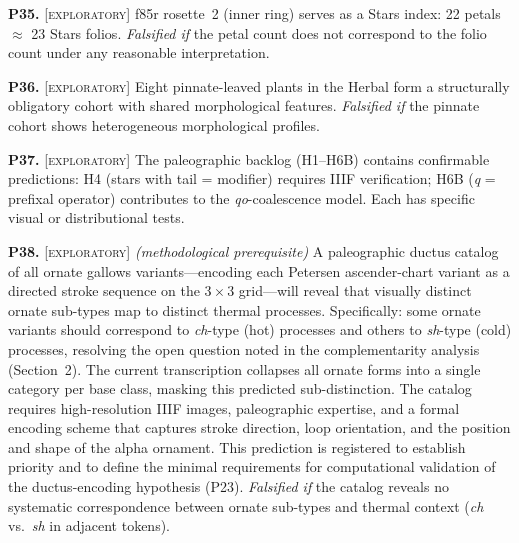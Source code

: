 \documentclass[11pt,a4paper]{article}
\newcommand{\exploratory}{\textsc{[exploratory]}}
\newcommand{\falsmark}{\textit{Falsified if}}
\begin{document}
\medskip

\noindent\textbf{P35.} \exploratory{} f85r rosette~2 (inner ring) serves as a Stars index: 22 petals $\approx$ 23 Stars folios. \falsmark{} the petal count does not correspond to the folio count under any reasonable interpretation.

\medskip

\noindent\textbf{P36.} \exploratory{} Eight pinnate-leaved plants in the Herbal form a structurally obligatory cohort with shared morphological features. \falsmark{} the pinnate cohort shows heterogeneous morphological profiles.

\medskip

\noindent\textbf{P37.} \exploratory{} The paleographic backlog (H1--H6B) contains confirmable predictions: H4 (stars with tail = modifier) requires IIIF verification; H6B (\textit{q} = prefixal operator) contributes to the \textit{qo}-coalescence model. Each has specific visual or distributional tests.

\medskip

\noindent\textbf{P38.} \exploratory{} \textit{(methodological prerequisite)} A paleographic ductus catalog of all ornate gallows variants---encoding each Petersen ascender-chart variant as a directed stroke sequence on the $3 \times 3$ grid---will reveal that visually distinct ornate sub-types map to distinct thermal processes. Specifically: some ornate variants should correspond to \textit{ch}-type (hot) processes and others to \textit{sh}-type (cold) processes, resolving the open question noted in the complementarity analysis (Section~2). The current transcription collapses all ornate forms into a single category per base class, masking this predicted sub-distinction. The catalog requires high-resolution IIIF images, paleographic expertise, and a formal encoding scheme that captures stroke direction, loop orientation, and the position and shape of the alpha ornament. This prediction is registered to establish priority and to define the minimal requirements for computational validation of the ductus-encoding hypothesis (P23). \falsmark{} the catalog reveals no systematic correspondence between ornate sub-types and thermal context (\textit{ch} vs.\ \textit{sh} in adjacent tokens).

\medskip
\end{document}
